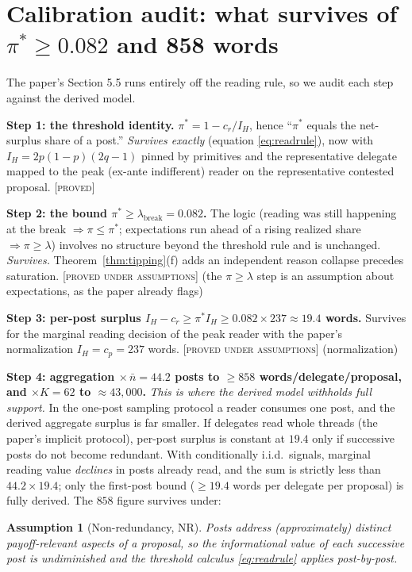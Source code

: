 \documentclass[11pt]{article}
\newtheorem{assumption}{Assumption}
\theoremstyle{remark}
\newcommand{\statusP}{\textsc{[proved]}}
\newcommand{\statusPA}{\textsc{[proved under assumptions]}}
\begin{document}
\section{Calibration audit: what survives of $\pi^*\ge0.082$ and 858 words}
\label{sec:calibration}

The paper's Section 5.5 runs entirely off the reading rule, so we audit each
step against the derived model.

\textbf{Step 1: the threshold identity.} $\pi^*=1-c_r/I_H$, hence
``$\pi^*$ equals the net-surplus share of a post.'' \emph{Survives exactly}
(equation \eqref{eq:readrule}), now with $I_H=2p(1-p)(2q-1)$ pinned by
primitives and the representative delegate mapped to the peak (ex-ante
indifferent) reader on the representative contested proposal. \statusP

\textbf{Step 2: the bound $\pi^*\ge\lambda_{\text{break}}=0.082$.} The logic
(reading was still happening at the break $\Rightarrow\pi\le\pi^*$; expectations
run ahead of a rising realized share $\Rightarrow\pi\ge\lambda$) involves no
structure beyond the threshold rule and is unchanged. \emph{Survives.}
Theorem~\ref{thm:tipping}(f) adds an independent reason collapse precedes
saturation. \statusPA{} (the $\pi\ge\lambda$ step is an assumption about
expectations, as the paper already flags)

\textbf{Step 3: per-post surplus $I_H-c_r\ge\pi^*I_H\ge0.082\times237\approx19.4$
words.} Survives for the marginal reading decision of the peak reader with the
paper's normalization $I_H=c_p=237$ words. \statusPA{} (normalization)

\textbf{Step 4: aggregation $\times\,\bar n=44.2$ posts to
$\ge858$ words/delegate/proposal, and $\times K=62$ to $\approx43{,}000$.}
\emph{This is where the derived model withholds full support.} In the one-post
sampling protocol a reader consumes one post, and the derived aggregate surplus
is far smaller. If delegates read whole threads (the paper's implicit protocol),
per-post surplus is constant at $19.4$ only if successive posts do not become
redundant. With conditionally i.i.d.\ signals, marginal reading value
\emph{declines} in posts already read, and the sum is strictly less than
$44.2\times19.4$; only the first-post bound ($\ge19.4$ words per delegate per
proposal) is fully derived. The $858$ figure survives under:

\begin{assumption}[Non-redundancy, NR]\label{ass:nr}
Posts address (approximately) distinct payoff-relevant aspects of a proposal,
so the informational value of each successive post is undiminished and the
threshold calculus \eqref{eq:readrule} applies post-by-post.
\end{assumption}
\end{document}
